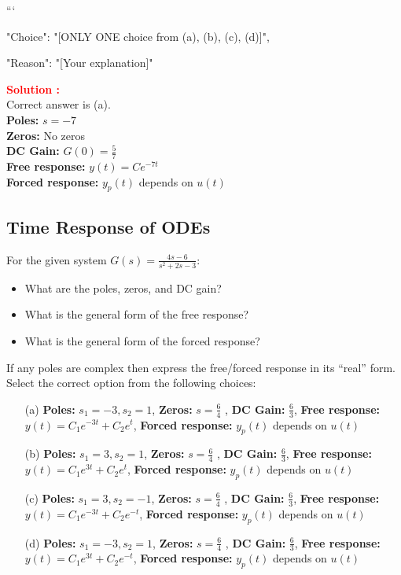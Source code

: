 \documentclass[12pt]{article}
\begin{document}
```
{

"Choice": "[ONLY ONE choice from (a), (b), (c), (d)]",

"Reason": "[Your explanation]"

}

\textbf{\textcolor{red}{Solution :}} \\
Correct answer is (a).\\
\textbf{Poles:} \(s = -7\) \\
\textbf{Zeros:} No zeros \\
\textbf{DC Gain:} \(G(0) = \frac{5}{7}\) \\
\textbf{Free response:} \(y(t) = C e^{-7t}\) \\
\textbf{Forced response:} \(y_p(t)\) depends on \(u(t)\) \\
\clearpage

\subsection{Time Response of ODEs}

For the given system \(G(s) = \frac{4s-6}{s^2+2s-3}\):
\begin{itemize}
    \item  What are the poles, zeros, and DC gain?
    \item  What is the general form of the free response?
    \item  What is the general form of the forced response? 
\end{itemize}
If any poles are complex then express the free/forced response in its “real” form.
Select the correct option from the following choices:
\begin{enumerate}
    \item [(a)] \textbf{Poles:} \(s_1 = -3, s_2 = 1\), \textbf{Zeros:}  \(s = \frac{6}{4}\) , \textbf{DC Gain:} \( \frac{6}{3} \), \textbf{Free response:} \(y(t) = C_1 e^{-3t} + C_2 e^{t}\), \textbf{Forced response:} \(y_p(t)\) depends on \(u(t)\)
    
    \item [(b)] \textbf{Poles:} \(s_1 = 3, s_2 = 1\), \textbf{Zeros:}  \(s = \frac{6}{4}\) , \textbf{DC Gain:} \( \frac{6}{3} \), \textbf{Free response:} \(y(t) = C_1 e^{3t} + C_2 e^{t}\), \textbf{Forced response:} \(y_p(t)\) depends on \(u(t)\)
    
    \item [(c)] \textbf{Poles:} \(s_1 = 3, s_2 = -1\), \textbf{Zeros:}  \(s = \frac{6}{4}\) , \textbf{DC Gain:} \( \frac{6}{3} \), \textbf{Free response:} \(y(t) = C_1 e^{-3t} + C_2 e^{-t}\), \textbf{Forced response:} \(y_p(t)\) depends on \(u(t)\)
    
    \item [(d)] \textbf{Poles:} \(s_1 = -3, s_2 = 1\), \textbf{Zeros:}  \(s = \frac{6}{4}\) , \textbf{DC Gain:} \( \frac{6}{3} \), \textbf{Free response:} \(y(t) = C_1 e^{3t} + C_2 e^{-t}\), \textbf{Forced response:} \(y_p(t)\) depends on \(u(t)\)
\end{enumerate}
\end{document}
